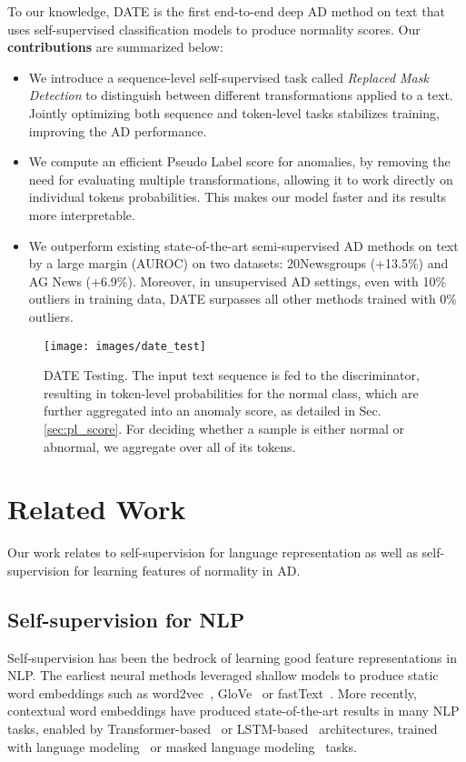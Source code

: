 \documentclass[11pt]{article}
\begin{document}
To our knowledge, DATE is the first end-to-end deep AD method on text that uses self-supervised classification models to produce normality scores. Our \textbf{contributions} are summarized below:

\begin{itemize}
    \item We introduce a sequence-level self-supervised task called \emph{Replaced Mask Detection} to distinguish between different transformations applied to a text. Jointly optimizing both sequence and token-level tasks stabilizes training, improving the AD performance.
    \item We compute an efficient Pseudo Label score for anomalies, by removing the need for evaluating multiple transformations, allowing it to work directly on individual tokens probabilities. This makes our model faster and its results more interpretable.
\item We outperform existing state-of-the-art semi-supervised AD methods on text by a large margin (AUROC) on two datasets: 20Newsgroups (+13.5\%) and AG News (+6.9\%). Moreover, in unsupervised AD settings, even with 10\% outliers in training data, DATE surpasses all other methods trained with 0\% outliers.
\end{itemize}


\begin{figure}[t!]
\centering
\texttt{[image: images/date\_test]}
\caption{DATE Testing. The input text sequence is fed to the discriminator, resulting in token-level probabilities for the normal class, which are further aggregated into an anomaly score, as detailed in Sec.\ref{sec:pl_score}. For deciding whether a sample is either normal or abnormal, we aggregate over all of its tokens.}
\label{fig:date_test}
\end{figure}

\section{Related Work}
Our work relates to self-supervision for language representation as well as self-supervision for learning features of normality in AD.

\subsection{Self-supervision for NLP}
Self-supervision has been the bedrock of learning good feature representations in NLP. The earliest neural methods leveraged shallow models to produce static word embeddings such as word2vec~\cite{Mikolov2013}, GloVe~\cite{Pennington2014} or fastText~\cite{Bojanowski2017,Joulin2017}. More recently, contextual word embeddings have produced state-of-the-art results in many NLP tasks, enabled by Transformer-based~\cite{Vaswani2017} or LSTM-based~\cite{Hochreiter1997} architectures, trained with language modeling~\cite{Peters2018,Radford2019} or masked language modeling~\cite{Devlin2018} tasks.
\end{document}
